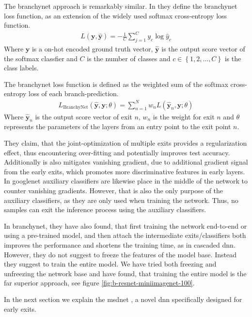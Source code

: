 The \gls{branchynet} approach is remarkably similar. In \cite{teerapittayanon_branchynet:_2016} they define the \gls{branchynet} loss function, as an extension of the widely used softmax cross-entropy loss function.
\begin{align}
L\left(\bm{y},\hat{\bm{y}}\right) = - \frac{1}{C} \sum_{j =1}^{C} y_c \log \hat{y}_c
\end{align}
 Where $ \bm{y} $ is a on-hot encoded ground truth vector, $ \bm{\hat{y}} $ is the output score vector of the softmax classfier and $ C $ is the number of classes and $ c \in \left\{1, 2,  \dots, C\right\} $ is the class labels.
	
The \gls{branchynet} loss function is defined as the weighted sum of the softmax cross-entropy loss of each branch-prediction. 
\begin{align}
	L_{\mathrm{BranchyNet}}(\hat{\bm{y}},\bm{y};\theta) = \sum_{n=1}^{N} w_n L \left(\hat{\bm{y}}_{n},\bm{y};\theta\right)
\end{align}
Where $ \bm{\hat{y}}_n $ is the output score vector of exit $ n $, $ w_n $ is the weight for exit $ n $ and $ \theta $ represents the parameters of the layers from an entry point to the exit point $ n $.

They claim, that the joint-optimization of multiple exits provides a regularization effect, thus encountering over-fitting and potentially improves test accuracy. Additionally is also mitigates vanishing gradient, due to additional gradient signal from the early exits, which promotes more discriminative features in early layers. In \gls{googlenet} \cite{szegedy_going_2015} auxiliary classifiers are likewise place in the middle of the network to counter vanishing gradients. However, that is also the only purpose of the auxiliary classifiers, as they are only used when training the network. Thus, no samples can exit the inference process using the auxiliary classifiers. 

In \gls{branchynet}, they have also found, that first training the network end-to-end or using a pre-trained model, and then attach the intermediate exits/classifiers both improves the performance and shortens the training time, as in cascaded \gls{dnn}. However, they do not suggest to freeze the features of the model base. Instead they suggest to train the entire model. We have tried both freezing and unfreezing the network base and have found, that training the entire model is the far superior approach, see figure \ref{fig:b-resnet-miniimagenet-100}. 

In the next section we explain the \gls{msdnet} \cite{huang_multi-scale_2017}, a novel \gls{dnn} specifically designed for early exits.

